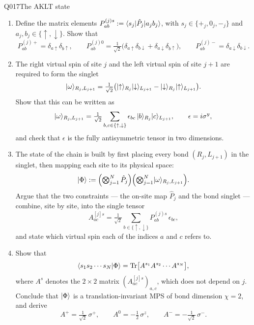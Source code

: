 \begin{entry}{Q017}{The AKLT state}
\begin{problem}
\begin{enumerate}[label=\textbf{(\alph*)},leftmargin=*]
  \item Define the matrix elements
        $P^{(j)s}_{ab}:=\langle s_j \rvert\hat P_j\lvert a_j b_j \rangle$, with
        $s_j\in\{+_j,0_j,-_j\}$ and $a_j,b_j\in\{\uparrow,\downarrow\}$. Show that
        \[
          P^{(j)+}_{ab}=\delta_{a\uparrow}\delta_{b\uparrow},
          \qquad
          P^{(j)0}_{ab}=\tfrac{1}{\sqrt2}\bigl(\delta_{a\uparrow}\delta_{b\downarrow}
            +\delta_{a\downarrow}\delta_{b\uparrow}\bigr),
          \qquad
          P^{(j)-}_{ab}=\delta_{a\downarrow}\delta_{b\downarrow}.
        \]

  \item The right virtual spin of site $j$ and the left virtual spin of site $j+1$ are
        required to form the singlet
        \[
          \lvert \omega \rangle_{R_j,L_{j+1}}
          =\tfrac{1}{\sqrt2}\bigl(\lvert \uparrow \rangle_{R_j}\lvert \downarrow \rangle_{L_{j+1}}
            -\lvert \downarrow \rangle_{R_j}\lvert \uparrow \rangle_{L_{j+1}}\bigr).
        \]
        Show that this can be written as
        \[
          \lvert \omega \rangle_{R_j,L_{j+1}}
          =\tfrac{1}{\sqrt2}\sum_{b,c\in\{\uparrow,\downarrow\}}\epsilon_{bc}\,
            \lvert b \rangle_{R_j}\lvert c \rangle_{L_{j+1}},
          \qquad
          \epsilon=i\sigma^{y},
        \]
        and check that $\epsilon$ is the fully antisymmetric tensor in two dimensions.

  \item The state of the chain is built by first placing every bond $(R_j,L_{j+1})$ in
        the singlet, then mapping each site to its physical space:
        \[
          \lvert \Phi \rangle
          :=\Bigl(\textstyle\bigotimes_{j=1}^{N}\hat P_j\Bigr)
            \Bigl(\textstyle\bigotimes_{j=1}^{N}\lvert \omega \rangle_{R_j,L_{j+1}}\Bigr).
        \]
        Argue that the two constraints --- the on-site map $\hat P_j$ and the bond
        singlet --- combine, site by site, into the single tensor
        \[
          A^{[j]s}_{ac}=\tfrac{1}{\sqrt2}\sum_{b\in\{\uparrow,\downarrow\}}
            P^{(j)s}_{ab}\,\epsilon_{bc},
        \]
        and state which virtual spin each of the indices $a$ and $c$ refers to.

  \item Show that
        \[
          \langle s_1s_2\cdots s_N \vert \Phi \rangle
          =\operatorname{Tr}\bigl[A^{s_1}A^{s_2}\cdots A^{s_N}\bigr],
        \]
        where $A^{s}$ denotes the $2\times2$ matrix $(A^{[j]s}_{ac})_{a,c}$, which does
        not depend on $j$. Conclude that $\lvert \Phi \rangle$ is a translation-invariant MPS of
        bond dimension $\chi=2$, and derive
        \[
          A^{+}=\tfrac{1}{\sqrt2}\,\sigma^{+},
          \qquad
          A^{0}=-\tfrac12\,\sigma^{z},
          \qquad
          A^{-}=-\tfrac{1}{\sqrt2}\,\sigma^{-}.
        \]


\end{enumerate}
\end{problem}
\end{entry}

